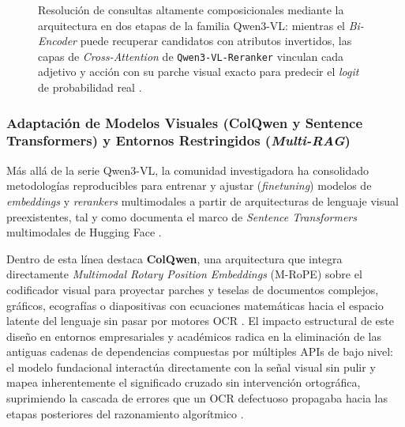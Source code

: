 \begin{figure}[htbp]
\caption{Resolución de consultas altamente composicionales mediante la arquitectura en dos etapas de la familia Qwen3-VL: mientras el \textit{Bi-Encoder} puede recuperar candidatos con atributos invertidos, las capas de \textit{Cross-Attention} de \texttt{Qwen3-VL-Reranker} vinculan cada adjetivo y acción con su parche visual exacto para predecir el \textit{logit} de probabilidad real \cite{learnopencv_qwen3, qwen3_vl_emb2026}.} %
\label{fig:qwen3_vl_composicional}
\end{figure}

\subsubsection{Adaptación de Modelos Visuales (ColQwen y Sentence Transformers) y Entornos Restringidos (\textit{Multi-RAG})}
\label{subsubsec:adaptacion_vlms_multirag}

Más allá de la serie Qwen3-VL, la comunidad investigadora ha consolidado metodologías reproducibles para entrenar y ajustar (\textit{finetuning}) modelos de \textit{embeddings} y \textit{rerankers} multimodales a partir de arquitecturas de lenguaje visual preexistentes, tal y como documenta el marco de \textit{Sentence Transformers} multimodales de Hugging Face \cite{hf_train_multimodal2026, qwen3_vl_emb2026}. %

Dentro de esta línea destaca \textbf{ColQwen}, una arquitectura que integra directamente \textit{Multimodal Rotary Position Embeddings} (M-RoPE) sobre el codificador visual para proyectar parches y teselas de documentos complejos, gráficos, ecografías o diapositivas con ecuaciones matemáticas hacia el espacio latente del lenguaje sin pasar por motores OCR \cite{prajwal2025multimodal}. %
El impacto estructural de este diseño en entornos empresariales y académicos radica en la eliminación de las antiguas cadenas de dependencias compuestas por múltiples APIs de bajo nivel: el modelo fundacional interactúa directamente con la señal visual sin pulir y mapea inherentemente el significado cruzado sin intervención ortográfica, suprimiendo la cascada de errores que un OCR defectuoso propagaba hacia las etapas posteriores del razonamiento algorítmico \cite{prajwal2025multimodal}. %

